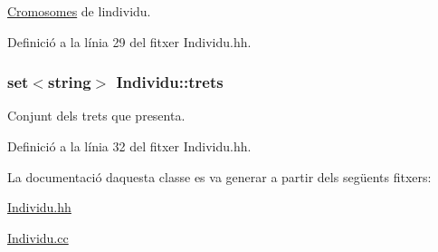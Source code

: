 \hyperlink{class_cromosomes}{Cromosomes} de l\textquotesingle{}individu. 



Definició a la línia 29 del fitxer Individu.\+hh.

\subsubsection[{\texorpdfstring{trets}{trets}}]{\setlength{\rightskip}{0pt plus 5cm}set$<$string$>$ Individu\+::trets\hspace{0.3cm}{\ttfamily [private]}}\hypertarget{class_individu_a0ac8e4f21a7d491e6c8b90f267065bca}{}\label{class_individu_a0ac8e4f21a7d491e6c8b90f267065bca}


Conjunt dels trets que presenta. 



Definició a la línia 32 del fitxer Individu.\+hh.



La documentació d\textquotesingle{}aquesta classe es va generar a partir dels següents fitxers\+:\begin{DoxyCompactItemize}
\item 
\hyperlink{_individu_8hh}{Individu.\+hh}\item 
\hyperlink{_individu_8cc}{Individu.\+cc}\end{DoxyCompactItemize}
